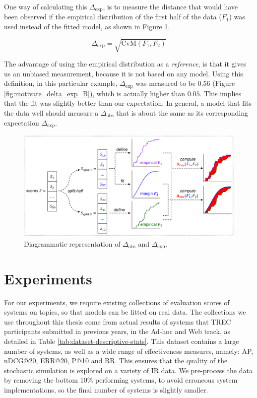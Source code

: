 One way of calculating this $\Delta_\text{exp}$, is to measure the distance that would have been observed if the empirical distribution of the first half of the data ($F_1$) was used instead of the fitted model, as shown in Figure \ref{fig:gof_diagram}. 

\begin{equation}\label{eq:Delta_exp}
	\Delta_\text{exp} = \sqrt{\text{CvM}\left(F_1, F_2\right)}
\end{equation}

The advantage of using the empirical distribution as a \textit{reference}, is that it gives us an unbiased measurement, because it is not based on any model. Using this definition, in this particular example, $\Delta_\text{exp}$ was measured to be $0.56$ (Figure \ref{fig:motivate_delta_exp_B}), which is actually higher than $0.05$. This implies that the fit was slightly better than our expectation. In general, a model that fits the data well should measure a $\Delta_\text{obs}$ that is about the same as its corresponding expectation $\Delta_\text{exp}$. 

\begin{figure}[t]
	\centering	
	\includegraphics[width=1.0\linewidth]{../diagrams/diag3_gof}
	\caption{Diagrammatic representation of $\Delta_\text{obs}$ and $\Delta_\text{exp}$.}
	\label{fig:gof_diagram}
\end{figure}

\section{Experiments}

For our experiments, we require existing collections of evaluation scores of systems on topics, so that models can be fitted on real data. The collections we use throughout this thesis come from actual results of systems that TREC participants submitted in previous years, in the Ad-hoc and Web track, as detailed in Table \ref{tab:dataset-descriptive-stats}. This dataset contains a large number of systems, as well as a wide range of effectiveness measures, namely: AP, nDCG@20, ERR@20, P@10 and RR. This ensures that the quality of the stochastic simulation is explored on a variety of IR data. We pre-process the data by removing the bottom 10\% performing systems, to avoid erroneous system implementations, so the final number of systems is slightly smaller.


